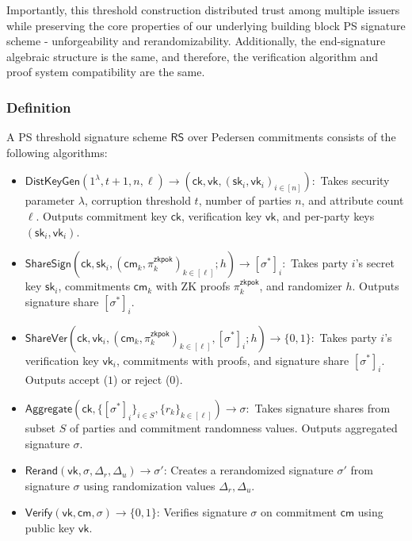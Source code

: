 Importantly, this threshold construction distributed trust among multiple issuers while preserving the core properties of our underlying building block PS signature scheme - unforgeability and rerandomizability. Additionally, the end-signature algebraic structure is the same, and therefore, the verification algorithm and proof system compatibility are the same.

\subsubsection{Definition}

\begin{definition}
A PS threshold signature scheme $\mathsf{RS}$ over Pedersen commitments consists of the following algorithms:
\begin{itemize}
    \item $\mathsf{DistKeyGen}(1^{\lambda}, t+1, n, \ell) \to (\mathsf{ck}, \mathsf{vk}, (\mathsf{sk}_i, \mathsf{vk}_i)_{i \in [n]}):$ Takes security parameter $\lambda$, corruption threshold $t$, number of parties $n$, and attribute count $\ell$. Outputs commitment key $\mathsf{ck}$, verification key $\mathsf{vk}$, and per-party keys $(\mathsf{sk}_i, \mathsf{vk}_i)$.
    
    \item $\mathsf{ShareSign}(\mathsf{ck}, \mathsf{sk}_i, (\mathsf{cm}_k, \pi_k^{\mathsf{zkpok}})_{k \in [\ell]}; h) \to [\sigma^*]_i:$ Takes party $i$'s secret key $\mathsf{sk}_i$, commitments $\mathsf{cm}_k$ with ZK proofs $\pi_k^{\mathsf{zkpok}}$, and randomizer $h$. Outputs signature share $[\sigma^*]_i$.
    
    \item $\mathsf{ShareVer}(\mathsf{ck}, \mathsf{vk}_i, (\mathsf{cm}_k, \pi_k^{\mathsf{zkpok}})_{k \in [\ell]}, [\sigma^*]_i; h) \to \{0,1\}:$ Takes party $i$'s verification key $\mathsf{vk}_i$, commitments with proofs, and signature share $[\sigma^*]_i$. Outputs accept ($1$) or reject ($0$).
    
    \item $\mathsf{Aggregate}(\mathsf{ck}, \{[\sigma^*]_i\}_{i \in S}, \{r_k\}_{k \in [\ell]}) \to \sigma:$ Takes signature shares from subset $S$ of parties and commitment randomness values. Outputs aggregated signature $\sigma$.

    \item $\mathsf{Rerand}(\mathsf{vk}, \sigma, \Delta_r, \Delta_u) \rightarrow \sigma'$: Creates a rerandomized signature $\sigma'$ from signature $\sigma$ using randomization values $\Delta_r, \Delta_u$.
    
    \item $\mathsf{Verify}(\mathsf{vk}, \mathsf{cm}, \sigma) \rightarrow \{0,1\}$: Verifies signature $\sigma$ on commitment $\mathsf{cm}$ using public key $\mathsf{vk}$.
    
\end{itemize}
\end{definition}




